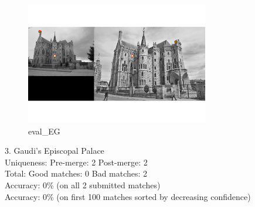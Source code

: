 \\
\begin{figure}[!h]
    \centering
    \includegraphics[width=8cm]{eval_EG.png}
    \caption{eval\_EG}
    \label{fig:result1}
\end{figure}
$3.$ Gaudi's Episcopal Palace\\
Uniqueness: Pre-merge:    2  Post-merge:  2\\
Total:      Good matches: 0  Bad matches: 2\\
Accuracy:  0\% (on all 2 submitted matches)\\
Accuracy:  0\% (on first 100 matches sorted by decreasing confidence)\\
\\
